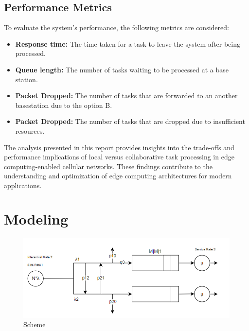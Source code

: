 \documentclass{report}
\begin{document}
\section{Performance Metrics}

To evaluate the system's performance, the following metrics are considered:
\begin{itemize}
    \item \textbf{Response time:} The time taken for a task to leave the system after being processed.
    \item \textbf{Queue length:} The number of tasks waiting to be processed at a base station.
    \item \textbf{Packet Dropped:} The number of tasks that are forwarded to an another basestation due to the option B.
    \item \textbf{Packet Dropped:} The number of tasks that are dropped due to insufficient resources.
\end{itemize}
The analysis presented in this report provides insights into the trade-offs and performance implications of local versus collaborative task processing in edge computing-enabled cellular networks. These findings contribute to the understanding and optimization of edge computing architectures for modern applications.

\chapter{Modeling}

\begin{figure}[H]
    \centering
    \includegraphics[width=\textwidth]{img/immagine.png}
    \caption{Scheme}
    \label{scheme}
\end{figure}
\end{document}

